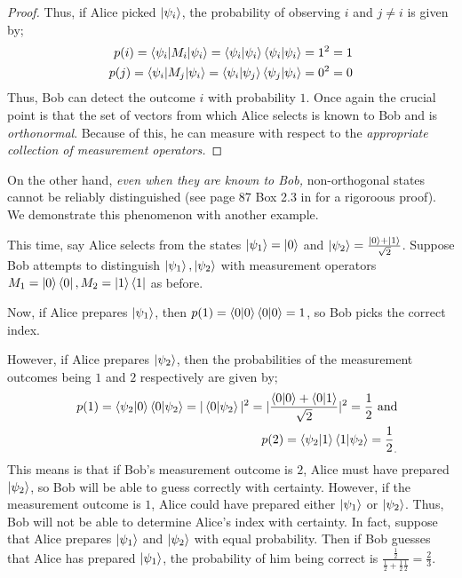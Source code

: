 {\begin{proof}
Thus, if Alice picked $\ket{\psi_i}$, the probability of observing $i$ and $j\neq i$ is given by;
\begin{align}
p(i)=\braket{\psi_i | M_i |\psi_i}=\braket{\psi_i |\psi_i}\braket{\psi_i |\psi_i}=1^2=1\\
p(j)=\braket{\psi_i | M_j |\psi_i}=\braket{\psi_i |\psi_j}\braket{\psi_j |\psi_i}=0^2=0\\
\end{align}
Thus, Bob can detect the outcome $i$ with probability $1$.  Once again the crucial point is that the set of vectors from which Alice selects is known to Bob and is {\emph{orthonormal}}. Because of this, he can measure with respect to the {\emph{appropriate collection of measurement operators.}} 
\end{proof}

On the other hand, {\emph{even when they are known to Bob,}} non-orthogonal states cannot be reliably distinguished (see page 87 Box 2.3 in \cite{Nielsen} for a rigoroous proof).  We demonstrate this phenomenon with another example.
\begin{example} \label{example: non-orthogonal states for measurements}
This time, say Alice selects from the states $\ket{\psi_1}=\ket{0}$ and  $\ket{\psi_2}=\frac{\ket{0}+\ket{1}}{\sqrt{2}}$. Suppose Bob attempts to distinguish $\ket{\psi_1}, \ket{\psi_2}$ with measurement operators $M_1=\ket{0}\bra{0}, M_2=\ket{1}\bra{1}$ as before.

Now, if Alice prepares $\ket{\psi_1}$, then $p(1)=\braket{0 |0}\braket{0|0}=1$, so Bob picks the correct index. 

However, if Alice prepares $\ket{\psi_2}$, then the probabilities of the measurement outcomes being $1$ and $2$ respectively are given by;
\begin{eqnarray}
    & &p(1)=\braket{\psi_2|0}\braket{0|\psi_2}=|\braket{0|\psi_2}|^2=|\frac{\braket{0|0}+\braket{0|1}}{\sqrt{2}}|^2=\frac{1}{2}\textrm{  and}\\
    & &p(2)=\braket{\psi_2|1}\braket{1|\psi_2}={\frac{1}{2}}_.
\end{eqnarray}
This means is that if Bob's measurement outcome is $2$, Alice must have prepared $\ket{\psi_2}$, so Bob will be able to guess correctly with certainty. However, if the measurement outcome is $1$, Alice could have prepared either $\ket{\psi_1}$ or $\ket{\psi_2}$.  Thus, Bob will not be able to determine Alice's index with certainty.  In fact, suppose that Alice prepares $\ket{\psi_1}$ and $\ket{\psi_2}$ with equal probability.  Then if Bob guesses that Alice has prepared $\ket{\psi_1}$, the probability of him being correct is $\frac{\frac{1}{2}}{\frac{1}{2}+\frac{1}{2}\frac{1}{2}}=\frac{2}{3}$.
\end{example}

}
